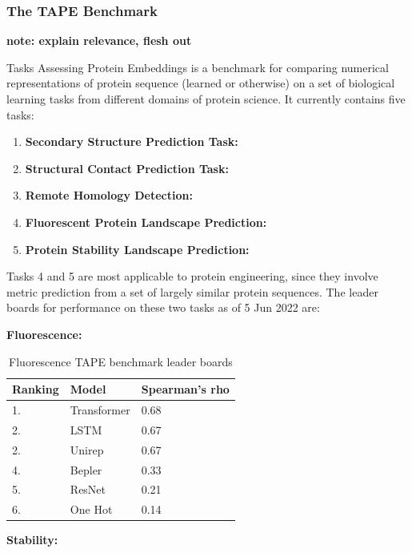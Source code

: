 \documentclass[16pt]{book}
\begin{document}
\subsubsection{The TAPE Benchmark}

\textbf{note: explain relevance, flesh out}

Tasks Assessing Protein Embeddings \cite{tape2019} is a benchmark for comparing numerical representations of protein sequence (learned or otherwise) on a set of biological learning tasks from different domains of protein science. 
It currently contains five tasks:

\begin{enumerate}
\item \textbf{Secondary Structure Prediction Task:}
\item \textbf{Structural Contact Prediction Task:}
\item \textbf{Remote Homology Detection:}
\item \textbf{Fluorescent Protein Landscape Prediction:}
\item \textbf{Protein Stability Landscape Prediction:}
\end{enumerate}

Tasks 4 and 5 are most applicable to protein engineering, since they involve metric prediction from a set of largely similar protein sequences.
The leader boards for performance on these two tasks as of 5 Jun 2022 are:

\textbf{Fluorescence:}

\begin{table}
	\begin{center}
		\caption{Fluorescence TAPE benchmark leader boards \label{tapefluor}}
		\begin{tabular}{l|p{3cm}|l}
			\textbf{Ranking} & \textbf{Model} & \textbf{Spearman's rho}\\
		\hline 
			 1. & Transformer & 0.68 \\
			 2. & LSTM & 0.67 \\
			 2. & Unirep & 0.67 \\
			 4. & Bepler & 0.33 \\
			 5. & ResNet & 0.21 \\
			 6. & One Hot & 0.14 \\
		\end{tabular}
	\end{center}
\end{table}


\textbf{Stability:}
\end{document}
